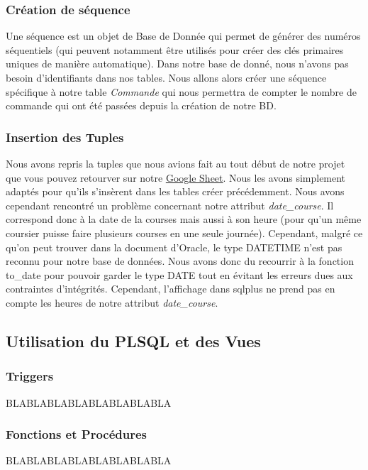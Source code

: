 \documentclass[french]{article}
\begin{document}
        \subsubsection*{Création de séquence}
            Une séquence est un objet de Base de Donnée qui permet de générer des numéros séquentiels (qui peuvent notamment être utilisés pour créer des clés primaires uniques de manière automatique). Dans notre base de donné, nous n'avons pas besoin d'identifiants dans nos tables. Nous allons alors créer une séquence spécifique à notre table \textit{Commande} qui nous permettra de compter le nombre de commande qui ont été passées depuis la création de notre BD.

        \subsubsection*{Insertion des Tuples}
            Nous avons repris la tuples que nous avions fait au tout début de notre projet que vous pouvez retourver sur notre \href{https://docs.google.com/spreadsheets/d/1HeSNFvLN3-yMfWHoYLVumzOeQpHXJHynqVBusbvl6EQ/edit?usp=sharing}{\underline{Google Sheet}}. Nous les avons simplement adaptés pour qu'ils s'insèrent dans les tables créer précédemment.\newline
            Nous avons cependant rencontré un problème concernant notre attribut \textit{date\_course}. Il correspond donc à la date de la courses mais aussi à son heure (pour qu'un même coursier puisse faire plusieurs courses en une seule journée). Cependant, malgré ce qu'on peut trouver dans la document d'Oracle, le type DATETIME n'est pas reconnu pour notre base de données. Nous avons donc du recourrir à la fonction to\_date pour pouvoir garder le type DATE tout en évitant les erreurs dues aux contraintes d'intégrités. Cependant, l'affichage dans sqlplus ne prend pas en compte les heures de notre attribut \textit{date\_course}. 

        \subsection*{Utilisation du PLSQL et des Vues}

            \subsubsection*{Triggers}
                BLABLABLABLABLABLABLABLA
            
            \subsubsection*{Fonctions et Procédures}
            BLABLABLABLABLABLABLABLA
            
\end{document}
